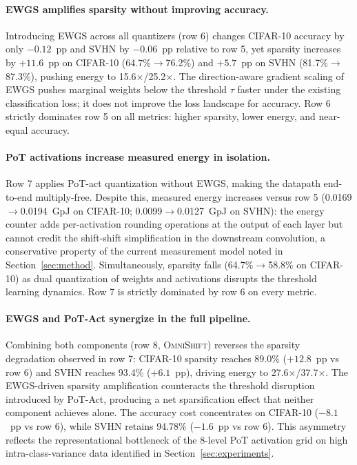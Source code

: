 \documentclass[12pt]{article}
\newcommand{\omnishift}{\textsc{OmniShift}}
\begin{document}
\paragraph{EWGS amplifies sparsity without improving accuracy.} Introducing EWGS across all quantizers (row 6) changes CIFAR-10 accuracy by only $-0.12$~pp and SVHN by $-0.06$~pp relative to row 5, yet sparsity increases by $+11.6$~pp on CIFAR-10 (64.7\%$\to$76.2\%) and $+5.7$~pp on SVHN (81.7\%$\to$87.3\%), pushing energy to 15.6$\times$/25.2$\times$. The direction-aware gradient scaling of EWGS pushes marginal weights below the threshold $\tau$ faster under the existing classification loss; it does not improve the loss landscape for accuracy. Row 6 strictly dominates row 5 on all metrics: higher sparsity, lower energy, and near-equal accuracy.

\paragraph{PoT activations increase measured energy in isolation.} Row 7 applies PoT-act quantization without EWGS, making the datapath end-to-end multiply-free. Despite this, measured energy increases versus row 5 (0.0169$\to$0.0194~GpJ on CIFAR-10; 0.0099$\to$0.0127~GpJ on SVHN): the energy counter adds per-activation rounding operations at the output of each layer but cannot credit the shift-shift simplification in the downstream convolution, a conservative property of the current measurement model noted in Section~\ref{sec:method}. Simultaneously, sparsity falls (64.7\%$\to$58.8\% on CIFAR-10) as dual quantization of weights and activations disrupts the threshold learning dynamics. Row 7 is strictly dominated by row 6 on every metric.

\paragraph{EWGS and PoT-Act synergize in the full pipeline.} Combining both components (row 8, \omnishift{}) reverses the sparsity degradation observed in row 7: CIFAR-10 sparsity reaches 89.0\% ($+12.8$~pp vs row 6) and SVHN reaches 93.4\% ($+6.1$~pp), driving energy to 27.6$\times$/37.7$\times$. The EWGS-driven sparsity amplification counteracts the threshold disruption introduced by PoT-Act, producing a net sparsification effect that neither component achieves alone. The accuracy cost concentrates on CIFAR-10 ($-8.1$~pp vs row 6), while SVHN retains 94.78\% ($-1.6$~pp vs row 6). This asymmetry reflects the representational bottleneck of the 8-level PoT activation grid on high intra-class-variance data identified in Section~\ref{sec:experiments}.
\end{document}
